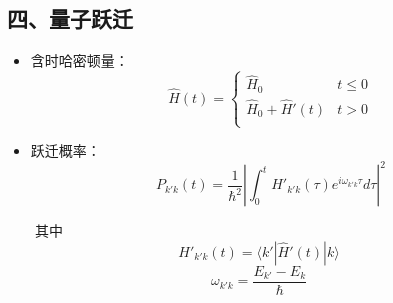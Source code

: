 \documentclass[UTF8,twocolumn]{ctexart}
\begin{document}
\subsection{四、量子跃迁}\label{ux56dbux91cfux5b50ux8dc3ux8fc1}

\begin{itemize}
\item
  含时哈密顿量： \[\hat{H}(t)=\begin{cases}
  \hat{H}_0 & t\leq0 \\
  \hat{H}_0+\hat{H}'(t) & t>0\\
  \end{cases}\]
\item
  跃迁概率：
  \[P_{k'k}(t)=\frac{1}{\hbar^2}|\int_0^tH'_{k'k}(\tau)e^{i\omega_{k'k}\tau}d\tau|^2\]
\end{itemize}

  其中 \[H'_{k'k}(t)=\langle k'|\hat{H}'(t)|k\rangle\]
\[\omega_{k'k}=\frac{E_{k'}-E_k}{\hbar}\]
\end{document}
